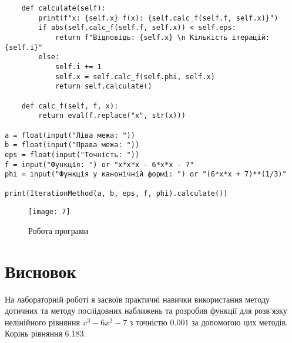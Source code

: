 \documentclass{article}
\begin{document}
\begin{large}
\begin{lstlisting}
	def calculate(self):
		print(f"x: {self.x} f(x): {self.calc_f(self.f, self.x)}")
		if abs(self.calc_f(self.f, self.x)) < self.eps:
			return f"Відповідь: {self.x} \n Кількість ітерацій: {self.i}"
		else:
			self.i += 1
			self.x = self.calc_f(self.phi, self.x)
			return self.calculate()
	
	def calc_f(self, f, x):
		return eval(f.replace("x", str(x)))

a = float(input("Ліва межа: "))
b = float(input("Права межа: "))
eps = float(input("Точність: "))
f = input("Функція: ") or "x*x*x - 6*x*x - 7"
phi = input("Функція у канонічній формі: ") or "(6*x*x + 7)**(1/3)"

print(IterationMethod(a, b, eps, f, phi).calculate())
\end{lstlisting}
	
	\begin{figure}[h!]
		\centering
		\texttt{[image: 7]}
		\caption{Робота програми}
	\end{figure}
	
	\section*{Висновок}
	На лабораторній роботі я засвоїв практичні навички використання методу дотичних та методу послідовних наближень та розробив функції для розв’язку нелінійного рівняння $x^3-6x^2-7$ з точністю $0.001$ за допомогою цих методів. Корінь рівняння 6.183.
	
\end{large}
\end{document}
